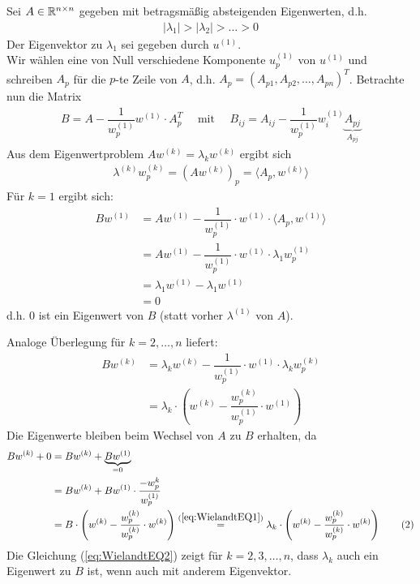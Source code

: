 Sei $A\in\mathbb R^{n\times n}$ gegeben mit betragsmäßig absteigenden Eigenwerten, d.h. 
%
\begin{align*}
  |\lambda_1| > |\lambda_2| > \dots > 0
\end{align*}
%
Der Eigenvektor zu $\lambda_1$ sei gegeben durch $u^{(1)}$. \\
Wir wählen eine von Null verschiedene Komponente $u^{(1)}_p$ von $u^{(1)}$ und schreiben $A_p$ für die $p$-te Zeile
von $A$, d.h. $A_p=(A_{p1},A_{p2},\dots,A_{pn})^T$. Betrachte nun die Matrix 
%
\begin{align*}
  B 
  = A - \dfrac{1}{w_p^{(1)}} w^{(1)}\cdot A_p^T\quad\text{ mit }\quad B_{ij} = 
  A_{ij}-\dfrac{1}{w^{(1)}_p}w^{(1)}_i\underbrace{A_{pj}}_{A_{pj}}
\end{align*}
%
Aus dem Eigenwertproblem $Aw^{(k)} = \lambda_k w^{(k)}$ ergibt sich
%
\begin{align*}
  \lambda^{(k)}w^{(k)}_p = (Aw^{(k)})_p = \langle A_p, w^{(k)}\rangle
\end{align*}
%
Für $k=1$ ergibt sich:
%
\begin{align*}
  Bw^{(1)} 
  &= Aw^{(1)} - \dfrac{1}{w^{(1)}_p} \cdot w^{(1)}\cdot \langle A_p, w^{(1)}\rangle \\
  &= Aw^{(1)} - \dfrac{1}{w^{(1)}_p} \cdot w^{(1)}\cdot \lambda_1 w^{(1)}_p \\
  &= \lambda_1 w^{(1)} - \lambda_1w^{(1)} \\
  &= 0
\end{align*}
%
d.h. $0$ ist ein Eigenwert von $B$  (statt vorher $\lambda^{(1)}$ von $A$).  

Analoge Überlegung für $k=2,\dots,n$ liefert:
%
\begin{align*}
  Bw^{(k)} 
  &= \lambda_k w^{(k)} - \dfrac{1}{w^{(1)}_p} \cdot w^{(1)}\cdot \lambda_kw^{(k)}_p \\
  &= \lambda_k\cdot\left(w^{(k)} - \dfrac{w^{(k)}_p}{w^{(1)}_p} \cdot w^{(1)}\right) 
  \tag{1}\label{eq:WielandtEQ1}
\end{align*}
%
Die Eigenwerte bleiben beim Wechsel von $A$ zu $B$ erhalten, da 
\begin{align*}
  Bw^{(k)} + 0 
  &= Bw^{(k)} + \underbrace{Bw^{(1)}}_{=0} \\
  &= Bw^{(k)} + Bw^{(1)}\cdot\dfrac{-w_p^{k}}{w_p^{(1)}} \\
  &= B\cdot\left(w^{(k)} - \dfrac{w^{(k)}_p}{w^{(k)}_p} \cdot w^{(k)}\right) 
  \stackrel{(\ref{eq:WielandtEQ1})}{=} 
  \lambda_k\cdot\left(w^{(k)} - \dfrac{w^{(k)}_p}{w^{(k)}_p} \cdot w^{(k)}\right)
  \tag{2}\label{eq:WielandtEQ2}
\end{align*}
Die Gleichung (\ref{eq:WielandtEQ2}) zeigt für $k=2,3,\dots,n$, dass $\lambda_k$ auch ein Eigenwert zu $B$ ist, 
wenn auch mit anderem Eigenvektor. 

